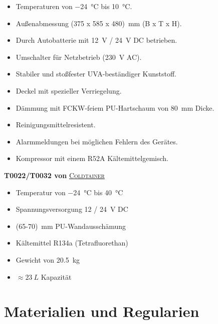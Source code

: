 	\begin{itemize}
		\item Temperaturen von \SI{-24}{\celsius} bis \SI{10}{\celsius}.
		\item Außenabmessung \SI{(375 x 585 x 480)}{\milli\metre} (B x T x H).
		\item Durch Autobatterie mit \SI{12}{\volt} / \SI{24}{\volt} DC betrieben.
		\item Umschalter für Netzbetrieb (\SI{230}{\volt} AC).
		\item Stabiler und stoßfester UVA-beständiger Kunststoff.
		\item Deckel mit spezieller Verriegelung.
		\item Dämmung mit FCKW-feiem PU-Hartschaum von \SI{80}{\milli\metre} Dicke.
		\item Reinigungsmittelresistent.
		\item Alarmmeldungen bei möglichen Fehlern des Gerätes.
		\item Kompressor mit einem R52A Kältemittelgemisch.
	\end{itemize}

	\textbf{T0022/T0032 von} \href{https://coldtainerusa.com/wp-content/uploads/2020/03/Product_Info_T0022-T0032_US_ColdtainerUSA-1.pdf}{\textsc{Coldtainer}}

	\begin{itemize}
		\item Temperatur von \SI{-24}{\celsius} bis \SI{40}{\celsius}
		\item Spannungsversorgung 12 / \SI{24}{\volt} DC %
		\item \SI{(65-70)}{\milli\metre} PU-Wandausschämung
		\item Kältemittel R134a (Tetrafluorethan)
		\item Gewicht von \SI{20,5}{\kilo\gram}
		\item \(\approx \SI{23}{L}\) Kapazität
	\end{itemize}

	\section{Materialien und Regularien}
